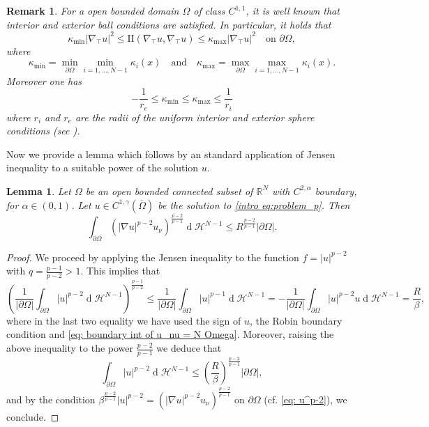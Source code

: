 \documentclass[10pt,a4paper, reqno]{amsart}
\numberwithin{equation}{section}
\newcommand{\R}{\mathbb{R}}
\newtheorem{rem}[teo]{Remark}
\newtheorem{lemma}[teo]{Lemma}
\renewcommand{\d}[1]{\ensuremath{\operatorname{d}\!{#1}}}
\begin{document}
    \begin{rem}\label{remark curvatures}
        For a open bounded domain $\Omega$ of class $C^{1,1}$, it is well known that interior and exterior ball conditions are satisfied. In particular, it holds that 
        \begin{equation*}
        \kappa_{\min} |\nabla_\top u|^2 \leq \mathrm{I\!I}(\nabla_\top u,\nabla_\top u) \leq \kappa_{\max} |\nabla_\top u|^2  \quad \text{on } \partial\Omega,
    \end{equation*}
    where
    \[
    \kappa_{\min} = \min_{\partial \Omega} \min_{i=1,\dots,N-1}  \kappa_i(x) \quad \text{and} \quad \kappa_{\max} = \max_{\partial \Omega} \max_{i=1,\dots,N-1}  \kappa_i(x).
    \]
    Moreover one has
    \[
    -\frac{1}{r_e} \leq  \kappa_{\min} \leq \kappa_{\max} \leq \frac{1}{r_i}
    \]
    where $r_i$ and $r_e$ are the radii of the uniform interior and exterior sphere conditions (see \cite[Rmk. 2.2]{mmp}).
    \end{rem}

    Now we provide a lemma which follows by an standard application of Jensen inequality to a suitable power of the solution $u$. 

    \begin{lemma}\label{lem:jensen ineq}
        Let $\Omega$ be an open bounded connected subset of $\R^N$ with $C^{2,\alpha}$ boundary, for $\alpha \in (0,1)$. Let $u \in C^{1,\gamma}(\overline{\Omega})$ be the solution to \eqref{intro eq:problem_p}. Then
        \begin{equation*}
            \int_{\partial\Omega} (|\nabla u|^{p-2} u_\nu)^{\frac{p-2}{p-1}} \d{}\mathcal{H}^{N-1} \leq R^{\frac{p-2}{p-1}} |\partial\Omega|.
        \end{equation*}
    \end{lemma}

    \begin{proof}
    We proceed by applying the Jensen inequality to the function $f= |u|^{p-2}$ with $q = \frac{p-1}{p-2} > 1$. This implies that
    \begin{equation*}
        \left(\frac{1}{|\partial\Omega|} \int_{\partial\Omega} |u|^{p-2} \d{}\mathcal{H}^{N-1}  \right)^{\frac{p-1}{p-2}} \leq \frac{1}{|\partial\Omega|} \int_{\partial\Omega} |u|^{p-1} \d{}\mathcal{H}^{N-1} = - \frac{1}{|\partial\Omega|} \int_{\partial\Omega} |u|^{p-2}u \d{}\mathcal{H}^{N-1} = \frac{R}{\beta},
    \end{equation*}
    where in the last two equality we have used the sign of $u$, the Robin boundary condition and \eqref{eq: boundary int of u_nu = N Omega}. Moreover, raising the above inequality to the power $\frac{p-2}{p-1}$ we deduce that 
    \[
    \int_{\partial\Omega} |u|^{p-2} \d{}\mathcal{H}^{N-1} \leq \left( \frac{R}{\beta}\right)^{\frac{p-2}{p-1}} |\partial\Omega|,
    \]
    and by the condition $\beta^{\frac{p-2}{p-1}} |u|^{p-2} = (|\nabla u|^{p-2} u_\nu)^{\frac{p-2}{p-1}}$ on $\partial\Omega$ (cf. \eqref{eq: u^p-2}), we conclude. 
    \end{proof}
\end{document}
